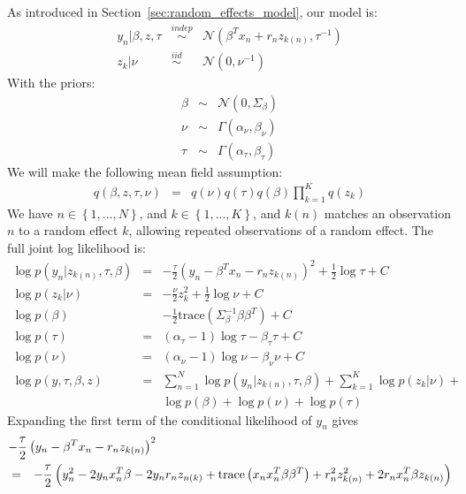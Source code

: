 \documentclass{article}\usepackage[]{graphicx}\usepackage[]{color}
\newcommand{\mysec}[1]{Section~\ref{sec:#1}}
\newcommand{\gauss}{\mathcal{N}} %
\newcommand{\constant}{C} %
\newcommand{\iid}{\stackrel{iid}{\sim}}
\newcommand{\indep}{\stackrel{indep}{\sim}}
\begin{document}
As introduced in \mysec{random_effects_model}, our model is:
%
\begin{eqnarray*}
y_{n}\vert\beta,z,\tau & \indep & \gauss\left(\beta^{T}x_{n}+r_{n}z_{k\left(n\right)},\tau^{-1}\right)\\
z_{k}\vert\nu & \iid & \gauss\left(0,\nu^{-1}\right)
\end{eqnarray*}
%
With the priors:
%
\begin{eqnarray*}
\beta & \sim & \gauss\left(0,\Sigma_{\beta}\right)\\
\nu & \sim & \Gamma\left(\alpha_{\nu},\beta_{\nu}\right)\\
\tau & \sim & \Gamma\left(\alpha_{\tau},\beta_{\tau}\right)
\end{eqnarray*}
%
We will make the following mean field assumption:
%
\begin{eqnarray*}
q\left(\beta,z,\tau,\nu\right) & = & q\left(\nu\right)q\left(\tau\right)q\left(\beta\right)\prod_{k=1}^{K}q\left(z_{k}\right)
\end{eqnarray*}
%
We have $n\in\left\{ 1,...,N\right\} $, and $k\in\left\{ 1,...,K\right\} $,
and $k\left(n\right)$ matches an observation $n$ to a random effect
$k$, allowing repeated observations of a random effect. The full
joint log likelihood is:
%
\begin{eqnarray*}
\log p\left(y_{n}\vert z_{k\left(n\right)},\tau,\beta\right) & = & -\frac{\tau}{2}\left(y_{n}-\beta^{T}x_{n}-r_{n}z_{k\left(n\right)}\right)^{2}+\frac{1}{2}\log\tau+\constant\\
\log p\left(z_{k}\vert\nu\right) & = & -\frac{\nu}{2}z_{k}^{2}+\frac{1}{2}\log\nu+\constant\\
\log p\left(\beta\right) &  & -\frac{1}{2}\textrm{trace}\left(\Sigma_{\beta}^{-1}\beta\beta^{T}\right)+\constant\\
\log p\left(\tau\right) & = & \left(\alpha_{\tau}-1\right)\log\tau-\beta_{\tau}\tau+\constant\\
\log p\left(\nu\right) & = & \left(\alpha_{\nu}-1\right)\log\nu-\beta_{\nu}\nu+\constant\\
\log p\left(y,\tau,\beta,z\right) & = & \sum_{n=1}^{N}\log p\left(y_{n}\vert z_{k\left(n\right)},\tau,\beta\right)+\sum_{k=1}^{K}\log p\left(z_{k}\vert\nu\right)+\\
 &  & \log p\left(\beta\right)+\log p\left(\nu\right)+\log p\left(\tau\right)
\end{eqnarray*}
%
Expanding the first term of the conditional likelihood of $y_{n}$
gives
%
\begin{eqnarray*}
\lefteqn{-\frac{\tau}{2}\left(y_{n}-\beta^{T}x_{n}-r_{n}z_{k\left(n\right)}\right)^{2}}\\
& = & -\frac{\tau}{2}\left(y_{n}^{2}-2y_{n}x_{n}^{T}\beta-2y_{n}r_{n}z_{n\left(k\right)}+\textrm{trace}\left(x_{n}x_{n}^{T}\beta\beta^{T}\right)+r_{n}^{2}z_{k\left(n\right)}^{2}+2r_{n}x_{n}^{T}\beta z_{k\left(n\right)}\right)
\end{eqnarray*}
\end{document}
